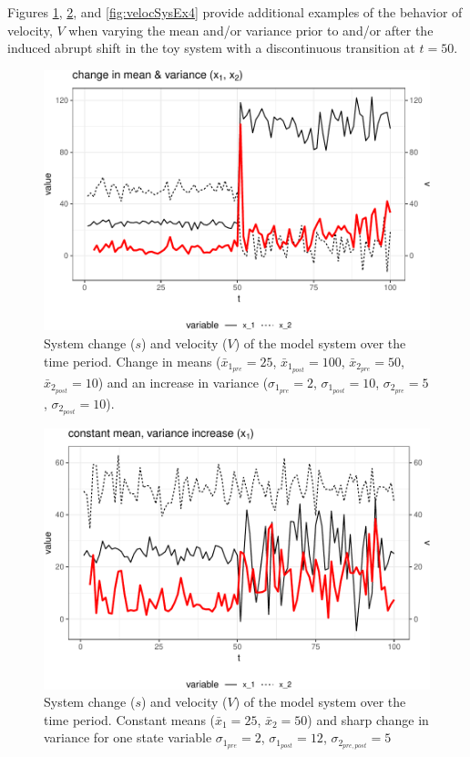 \documentclass[12pt,twoside,openany]{reedthesis}
\begin{document}
Figures \ref{fig:velocSysEx2}, \ref{fig:velocSysEx3}, and \ref{fig:velocSysEx4} provide additional examples of the behavior of velocity, \(V\) when varying the mean and/or variance prior to and/or after the induced abrupt shift in the toy system with a discontinuous transition at \(t=50\).
\begin{figure}
\includegraphics[width=0.85\linewidth]{_myDissertation_files/figure-latex/velocSysEx2-1} \caption{System change ($s$) and velocity ($V$) of the model system over the time period. Change in means ($\bar{x}_{1_{pre}}=25$, $\bar{x}_{1_{post}}=100$, $\bar{x}_{2_{pre}}=50$, $\bar{x}_{2_{post}}=10$) and an increase in variance ($\sigma_{1_{pre}}=2$, $\sigma_{1_{post}}=10$, $\sigma_{2_{pre}}=5$,  $\sigma_{2_{post}}=10$).}\label{fig:velocSysEx2}
\end{figure}
\newpage
\begin{figure}
\includegraphics[width=0.85\linewidth]{_myDissertation_files/figure-latex/velocSysEx3-1} \caption{System change ($s$) and velocity ($V$) of the model system over the time period. Constant means ($\bar{x}_1=25$, $\bar{x}_2=50$) and sharp change in variance for one state variable $\sigma_{1_{pre}} = 2$, $\sigma_{1_{post}} = 12$, $\sigma_{2_{pre,post}} = 5$}\label{fig:velocSysEx3}
\end{figure}
\end{document}
